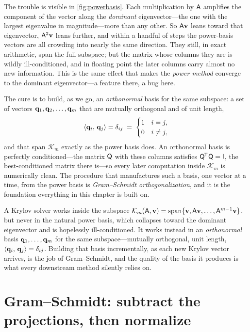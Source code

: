 The trouble is visible in \cref{fig:powerbasis}. Each multiplication by $\mathsf{A}$
amplifies the component of the vector along the \emph{dominant} eigenvector---the
one with the largest eigenvalue in magnitude---more than any other. So $\mathsf{A}\mathbf{v}$
leans toward that eigenvector, $\mathsf{A}^2\mathbf{v}$ leans further, and within a handful
of steps the power-basis vectors are all crowding into nearly the same direction.
They still, in exact arithmetic, span the full subspace; but the matrix whose
columns they are is wildly ill-conditioned, and in floating point the later columns
carry almost no new information. This is the same effect that makes the
\emph{power method} converge to the dominant eigenvector---a feature there, a bug
here.

The cure is to build, as we go, an \emph{orthonormal} basis for the same subspace:
a set of vectors $\mathbf{q}_1, \mathbf{q}_2, \dots, \mathbf{q}_m$ that are mutually orthogonal and of
unit length,
\[
  \left\langle \mathbf{q}_i,\, \mathbf{q}_j\right\rangle = \delta_{ij}
    \;=\;
    \begin{cases} 1 & i = j,\\ 0 & i \ne j, \end{cases}
\]
and that span $\mathcal{K}_m$ exactly as the power basis does. An orthonormal basis
is perfectly conditioned---the matrix $\mathsf{Q}$ with these columns satisfies
$\mathsf{Q}^{\!\top}\mathsf{Q} = \mathsf{I}$, the best-conditioned matrix there is---so every
later computation inside $\mathcal{K}_m$ is numerically clean. The procedure that
manufactures such a basis, one vector at a time, from the power basis is
\emph{Gram--Schmidt orthogonalization}, and it is the foundation everything in this
chapter is built on.

\begin{keyidea}
A Krylov solver works inside the subspace
$\mathcal{K}_m(\mathsf{A},\mathbf{v}) = \operatorname{span}\{\mathbf{v}, \mathsf{A}\mathbf{v}, \dots,
\mathsf{A}^{m-1}\mathbf{v}\}$, but never in the natural power basis, which collapses toward
the dominant eigenvector and is hopelessly ill-conditioned. It works instead in an
\emph{orthonormal} basis $\mathbf{q}_1,\dots,\mathbf{q}_m$ for the same subspace---mutually
orthogonal, unit length, $\left\langle \mathbf{q}_i,\, \mathbf{q}_j\right\rangle = \delta_{ij}$. Building that basis
incrementally, as each new Krylov vector arrives, is the job of Gram--Schmidt, and
the quality of the basis it produces is what every downstream method silently
relies on.
\end{keyidea}

\section{Gram--Schmidt: subtract the projections, then normalize}
\label{sec:gschmidt}

